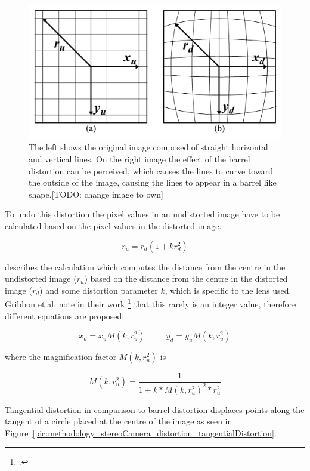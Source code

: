 \begin{figure}[h!]
	\centering
	\includegraphics[width=4.5in]{img/methodology_stereoCamera_distortion_barrelDistortion.png}
	\caption{The left shows the original image composed of straight horizontal and vertical lines. On the right image the effect of the barrel distortion can be perceived, which causes the lines to curve toward the outside of the image, causing the lines to appear in a barrel like shape.[TODO: change image to own]}
	\label{pic:methodology_stereoCamera_distortion_barrelDistortion}
\end{figure}

To undo this distortion the pixel values in an undistorted image have to be calculated based on the pixel values in the distorted image.

\begin{equation}
r_u = r_d(1+k r_d^2)
\end{equation}

describes the calculation which computes the distance from the centre in the undistorted image ($r_u$) based on the distance from the centre in the distorted image ($r_d$) and some distortion parameter $k$, which is specific to the lens used. Gribbon et.al. note in their work \footcite{Gribbon_Barrel_Distortion_Correction_Algorithm} that this rarely is an integer value, therefore different equations are proposed:

\begin{equation}
x_d = x_u M(k,r_u^2) \hspace{30pt} y_d = y_u M(k, r_u^2)
\end{equation}

where the magnification factor $M(k,r_u^2)$ is

\begin{equation}
M(k,r_u^2) = \frac{1}{1+k * M(k,r_u^2)^2 * r_u^2}
\end{equation}

Tangential distortion in comparison to barrel distortion displaces points along the tangent of a circle placed at the centre of the image as seen in Figure~\ref{pic:methodology_stereoCamera_distortion_tangentialDistortion}.


